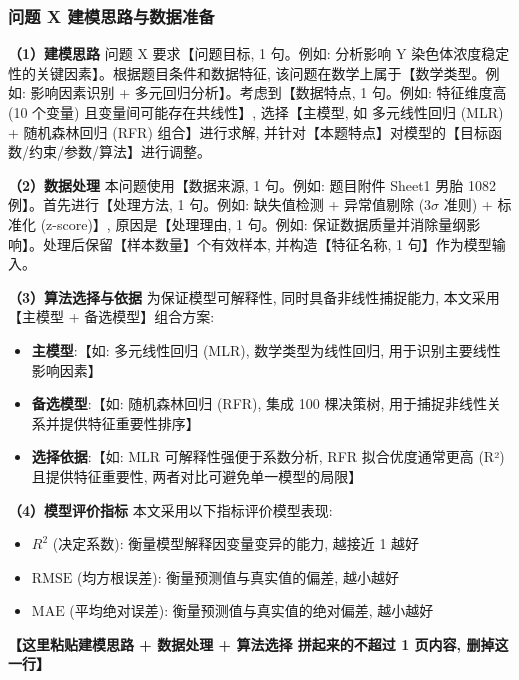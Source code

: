 
\subsubsection{问题 X 建模思路与数据准备}

\textbf{（1）建模思路} \quad 问题 X 要求【问题目标, 1 句。例如: 分析影响 Y 染色体浓度稳定性的关键因素】。根据题目条件和数据特征, 该问题在数学上属于【数学类型。例如: 影响因素识别 + 多元回归分析】。考虑到【数据特点, 1 句。例如: 特征维度高 (10 个变量) 且变量间可能存在共线性】, 选择【主模型, 如 多元线性回归 (MLR) + 随机森林回归 (RFR) 组合】进行求解, 并针对【本题特点】对模型的【目标函数/约束/参数/算法】进行调整。

\textbf{（2）数据处理} \quad 本问题使用【数据来源, 1 句。例如: 题目附件 Sheet1 男胎 1082 例】。首先进行【处理方法, 1 句。例如: 缺失值检测 + 异常值剔除 (3$\sigma$ 准则) + 标准化 (z-score)】, 原因是【处理理由, 1 句。例如: 保证数据质量并消除量纲影响】。处理后保留【样本数量】个有效样本, 并构造【特征名称, 1 句】作为模型输入。

\textbf{（3）算法选择与依据} \quad 为保证模型可解释性, 同时具备非线性捕捉能力, 本文采用【主模型 + 备选模型】组合方案:
\begin{itemize}
  \item \textbf{主模型}:【如: 多元线性回归 (MLR), 数学类型为线性回归, 用于识别主要线性影响因素】
  \item \textbf{备选模型}:【如: 随机森林回归 (RFR), 集成 100 棵决策树, 用于捕捉非线性关系并提供特征重要性排序】
  \item \textbf{选择依据}:【如: MLR 可解释性强便于系数分析, RFR 拟合优度通常更高 (R²) 且提供特征重要性, 两者对比可避免单一模型的局限】
\end{itemize}

\textbf{（4）模型评价指标} \quad 本文采用以下指标评价模型表现:
\begin{itemize}
  \item $R^2$ (决定系数): 衡量模型解释因变量变异的能力, 越接近 1 越好
  \item $\text{RMSE}$ (均方根误差): 衡量预测值与真实值的偏差, 越小越好
  \item $\text{MAE}$ (平均绝对误差): 衡量预测值与真实值的绝对偏差, 越小越好
\end{itemize}

\textbf{【这里粘贴建模思路 + 数据处理 + 算法选择 拼起来的不超过 1 页内容, 删掉这一行】}
